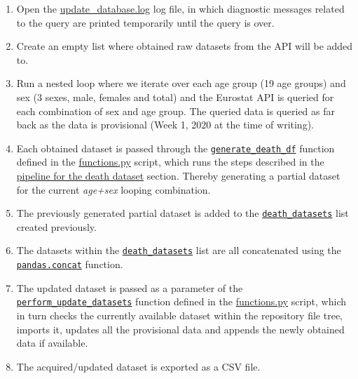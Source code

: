 \documentclass[
  a4paper]{article}
\begin{document}
\begin{enumerate}
\def\labelenumi{\arabic{enumi}.}
\item
  Open the
  \href{https://github.com/dreth/tfm_uc3m/blob/main/data/logs/update_database.log}{update\_database.log}
  log file, in which diagnostic messages related to the query are
  printed temporarily until the query is over.
\item
  Create an empty list where obtained raw datasets from the API will be
  added to.
\item
  Run a nested loop where we iterate over each age group (19 age groups)
  and sex (3 sexes, male, females and total) and the Eurostat API is
  queried for each combination of sex and age group. The queried data is
  queried as far back as the data is provisional (Week 1, 2020 at the
  time of writing).
\item
  Each obtained dataset is passed through the
  \href{https://github.com/dreth/tfm_uc3m/blob/report_ref/api/functions.py\#L84}{\texttt{generate\_death\_df}}
  function defined in the
  \href{https://github.com/dreth/tfm_uc3m/blob/main/api/functions.py}{functions.py}
  script, which runs the steps described in the
  \protect\hyperlink{DeathDatasetPipeline}{pipeline for the death
  dataset} section. Thereby generating a partial dataset for the current
  \emph{age+sex} looping combination.
\item
  The previously generated partial dataset is added to the
  \href{https://github.com/dreth/tfm_uc3m/blob/main/api/query.py\#L31}{\texttt{death\_datasets}}
  list created previously.
\item
  The datasets within the
  \href{https://github.com/dreth/tfm_uc3m/blob/main/api/query.py\#L48}{\texttt{death\_datasets}}
  list are all concatenated using the
  \href{https://pandas.pydata.org/pandas-docs/stable/reference/api/pandas.concat.html}{\texttt{pandas.concat}}
  function.
\item
  The updated dataset is passed as a parameter of the
  \href{https://github.com/dreth/tfm_uc3m/blob/main/api/query.py\#L51}{\texttt{perform\_update\_datasets}}
  function defined in the
  \href{https://github.com/dreth/tfm_uc3m/blob/report_ref/api/functions.py\#L447}{functions.py}
  script, which in turn checks the currently available dataset within
  the repository file tree, imports it, updates all the provisional data
  and appends the newly obtained data if available.
\item
  The acquired/updated dataset is exported as a CSV file.
\end{enumerate}
\end{document}
